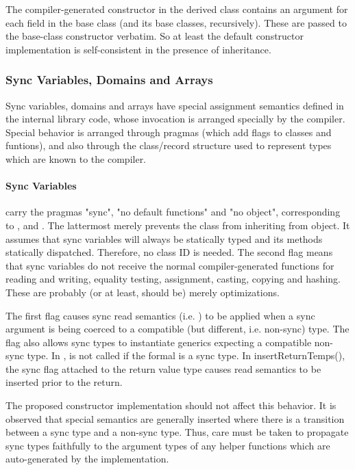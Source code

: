 The compiler-generated constructor in the derived class contains an argument for
each field in the base class (and its base classes, recursively).  These are
passed to the base-class constructor verbatim.  So at least the default
constructor implementation is self-consistent in the presence of inheritance.

\subsubsection{Sync Variables, Domains and Arrays} 

Sync variables, domains and arrays have special assignment semantics defined
in the internal library code, whose invocation is arranged specially by the
compiler.  Special behavior is arranged through pragmas (which add flags to classes and
funtions), and also through the class/record structure used to represent types
which are known to the compiler.  

\paragraph{Sync Variables} carry the pragmas "sync", "no default functions" and "no object",
corresponding to ,  and .  The
lattermost merely prevents the  class from inheriting from object.  It
assumes that sync variables will always be statically typed and its methods
statically dispatched.  Therefore, no class ID is needed.  The second flag means
that sync variables do not receive the normal compiler-generated functions for
reading and writing, equality testing, assignment, casting, copying and
hashing.  These are probably (or at least, should be) merely optimizations.

The first flag causes sync read semantics (i.e. ) to be applied
when a sync argument is being coerced to a compatible (but different,
i.e. non-sync) type.  The flag also allows sync types to instantiate generics
expecting a compatible non-sync type.  In ,  is
not called if the formal is a sync type.  In insertReturnTemps(), the sync flag
attached to the return value type causes read semantics to be inserted prior to
the return.

The proposed constructor implementation should not affect this behavior.  It is
observed that special semantics are generally inserted where there is a
transition between a sync type and a non-sync type.  Thus, care must be taken to
propagate sync types faithfully to the argument types of any helper functions
which are auto-generated by the implementation.  

